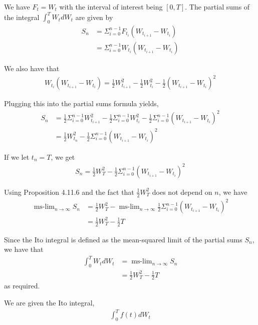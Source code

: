 \documentclass[12pt]{article}
\newenvironment{problem}[2][Problem]{\begin{trivlist}
\item[\hskip \labelsep {\bfseries #1}\hskip \labelsep {\bfseries #2.}]}{\end{trivlist}}
\begin{document}
We have $F_t = W_t$ with the interval of interest being $[0 , T]$. The partial sums of the integral $\int_0^T W_tdW_t$ are given by
\begin{align*}
S_n &= \Sigma_{i=0}^{n-1} F_{t_i}(W_{t_{i+1}} - W_{t_i})\\
&= \Sigma_{i=0}^{n-1} W_{t_i} (W_{t_{i+1}} - W_{t_i})
\end{align*}

We also have that
\begin{align*}
W_{t_i}(W_{t_{i+1}} - W_{t_i}) = \frac{1}{2}W^2_{t_{i+1}} - \frac{1}{2}W^2_{t_i} - \frac{1}{2}(W_{t_{i+1}} - W_{t_i})^2
\end{align*}

Plugging this into the partial sums formula yields,
\begin{align*}
S_n &= \frac{1}{2} \Sigma_{i=0}^{n-1} W^2_{t_{i+1}} - \frac{1}{2} \Sigma_{i=0}^{n-1} W^2_{t_i} - \frac{1}{2} \Sigma_{i=0}^{n-1} (W_{t_{i+1}} - W_{t_i})^2\\
&= \frac{1}{2}W^2_{t_n} - \frac{1}{2} \Sigma_{i=0}^{n-1} (W_{t_{i+1}} - W_{t_i})^2
\end{align*}

If we let $t_n = T$, we get
\begin{align*}
S_n = \frac{1}{2}W^2_T - \frac{1}{2} \Sigma_{i=0}^{n-1}(W_{t_{i+1}} - W_{t_i})^2
\end{align*}

Using Proposition 4.11.6 and the fact that $\frac{1}{2}W^2_T$ does not depend on $n$, we have
\begin{align*}
\operatorname{ms-\lim}_{n \to \infty} S_n &= \frac{1}{2}W^2_T - \operatorname{ms-\lim}_{n \to \infty} \frac{1}{2} \Sigma_{i=0}^{n-1}(W_{t_{i+1}} - W_{t_i})^2\\
&= \frac{1}{2}W^2_T - \frac{1}{2}T
\end{align*}

Since the Ito integral is defined as the mean-squared limit of the partial sums $S_n$, we have that
\begin{align*}
\int_0^T W_tdW_t &= \operatorname{ms-\lim}_{n \to \infty} S_n\\
&= \frac{1}{2}W^2_T - \frac{1}{2}T
\end{align*}
as required.

\begin{problem}{14}
\end{problem}

We are given the Ito integral,
\begin{align*}
\int_0^T f(t)dW_t
\end{align*}
\end{document}

